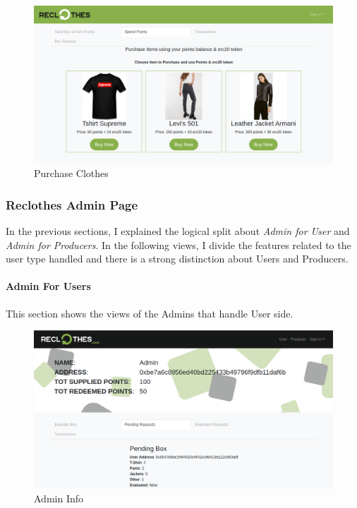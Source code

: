 \begin{figure}[h!]
    \centering
    \includegraphics[totalheight=7.5cm]{img/dapp/user-buy.png}
    \caption{Purchase Clothes}
    \label{fig:purchase_clothes}
\end{figure}

\newpage
\subsubsection{Reclothes Admin Page}

In the previous sections, I explained the logical split about \textit{Admin for User} and \textit{Admin for Producers}.
In the following views, I divide the features related to the user type handled and there is a strong distinction about 
Users and Producers.

\paragraph{Admin For Users}

This section shows the views of the Admins that handle User side.

\begin{figure}[h!]
    \centering
    \includegraphics[totalheight=7.5cm]{img/dapp/admin-info.png}
    \caption{Admin Info}
    \label{fig:admin_info}
\end{figure}

